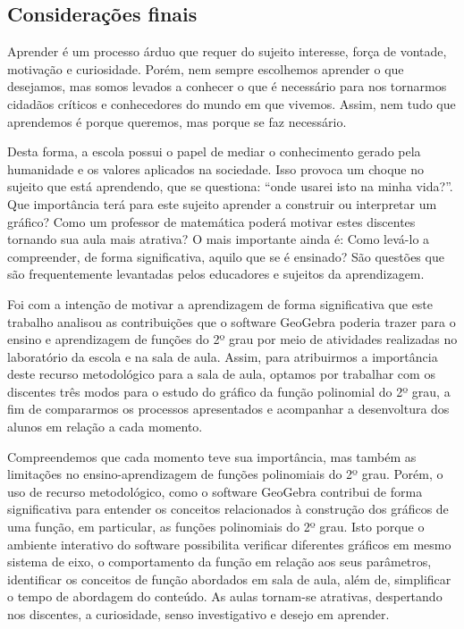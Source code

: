 \begin{refsection}
    \section{Considerações finais}

    Aprender é um processo árduo que requer do sujeito interesse, força de vontade, motivação e curiosidade. Porém, nem sempre escolhemos aprender o que desejamos, mas somos levados a conhecer o que é necessário para nos tornarmos cidadãos críticos e conhecedores do mundo em que vivemos. Assim, nem tudo que aprendemos é porque queremos, mas porque se faz necessário. 

    Desta forma, a escola possui o papel de mediar o conhecimento gerado pela humanidade e os valores aplicados na sociedade. Isso provoca um choque no sujeito que está aprendendo, que se questiona: “onde usarei isto na minha vida?”. Que importância terá para este sujeito aprender a construir ou interpretar um gráfico? Como um professor de matemática poderá motivar estes discentes tornando sua aula mais atrativa? O mais importante ainda é: Como levá-lo a compreender, de forma significativa, aquilo que se é ensinado? São questões que são frequentemente levantadas pelos educadores e sujeitos da aprendizagem. 

    Foi com a intenção de motivar a aprendizagem de forma significativa que este trabalho analisou as contribuições que o software GeoGebra poderia trazer para o ensino e aprendizagem de funções do 2º grau por meio de atividades realizadas no laboratório da escola e na sala de aula. Assim, para atribuirmos a importância deste recurso metodológico para a sala de aula, optamos por trabalhar com os discentes três modos para o estudo do gráfico da função polinomial do 2º grau, a fim de compararmos os processos apresentados e acompanhar a desenvoltura dos alunos em relação a cada momento. 

    Compreendemos que cada momento teve sua importância, mas também as limitações no ensino-aprendizagem de funções polinomiais do 2º grau. Porém, o uso de recurso metodológico, como o software GeoGebra contribui de forma significativa para entender os conceitos relacionados à construção dos gráficos de uma função, em particular, as funções polinomiais do 2º grau. Isto porque o ambiente interativo do software possibilita verificar diferentes gráficos em mesmo sistema de eixo, o comportamento da função em relação aos seus parâmetros, identificar os conceitos de função abordados em sala de aula, além de, simplificar o tempo de abordagem do conteúdo. As aulas tornam-se atrativas, despertando nos discentes, a curiosidade, senso investigativo e desejo em aprender. 


\end{refsection}
